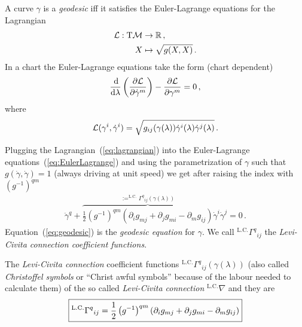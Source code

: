 \documentclass[11pt, a4paper, twocolumn]{article} %
\begin{document}
\begin{theorem}
    A curve $\gamma$ is a \textit{geodesic} iff it satisfies the Euler-Lagrange equations for
    the Lagrangian
    \begin{align}
        \calL: \T \M &\to \mathbb{R}\,,\\
        X &\mapsto \sqrt{g(X,X)}\,.
    \end{align}
    In a chart the Euler-Lagrange equations take the form (chart dependent)
    \begin{equation}
        \frac{\operatorname{d\!}}{\operatorname{d\!} \lambda}\left( \frac{\partial \mathcal{L}}{\partial \dot{\gamma}^m} \right) -
        \frac{\partial \mathcal{L}}{\partial \gamma^m} = 0\,,
        \label{eq:EulerLagrange}
    \end{equation}
    where
    \begin{equation}
        \mathcal{L}(\gamma^i, \dot{\gamma}^i) = \sqrt{g_{ij}(\gamma (\lambda)) \dot{\gamma}^i(\lambda)
            \dot{\gamma}^j(\lambda)}\,.
            \label{eq:lagrangian}
    \end{equation}
\end{theorem}
Plugging the Lagrangian~(\ref{eq:lagrangian}) into the Euler-Lagrange equations~(\ref{eq:EulerLagrange})
and using the parametrization of $\gamma$ such that $g(\dot\gamma, \dot\gamma)=1$
(always driving at unit speed) we get after raising the index with $(g^{-1})^{qm}$
\begin{align}
    \ddot{\gamma}^q + 
    \overbrace{\frac{1}{2}\left( g^{-1} \right)^{qm} \left( \partial_i g_{mj} + \partial_j g_{mi}
    - \partial_m g_{ij} \right)}^{:= ^\text{L.C.}\Gamma^q{}_{ij}(\gamma(\lambda))} \dot{\gamma}^i \dot{\gamma}^j = 0\,.
    \label{eq:geodesic}
\end{align}
Equation~(\ref{eq:geodesic}) is the \textit{geodesic equation} for $\gamma$.
We call $^\text{L.C.}\Gamma^q{}_{ij}$ the \textit{Levi-Civita connection coefficient functions}.
\begin{defn}
    The \textit{Levi-Civita connection} coefficient functions $^\text{L.C.}\Gamma^q{}_{ij}(\gamma(\lambda))$
    (also called \textit{Christoffel symbols} or ``Christ awful symbols'' because of the labour needed 
    to calculate them)
    of the so called \textit{Levi-Civita connection} $^\text{L.C.}\nabla$ and they are
    \begin{equation}
        \boxed{%
        ^\text{L.C.}\Gamma^q{}_{ij} = 
        \frac{1}{2}\left( g^{-1} \right)^{qm} \left( \partial_i g_{mj} + \partial_j g_{mi}
        - \partial_m g_{ij} \right)
    }
    \end{equation}
\end{defn}
\end{document}
